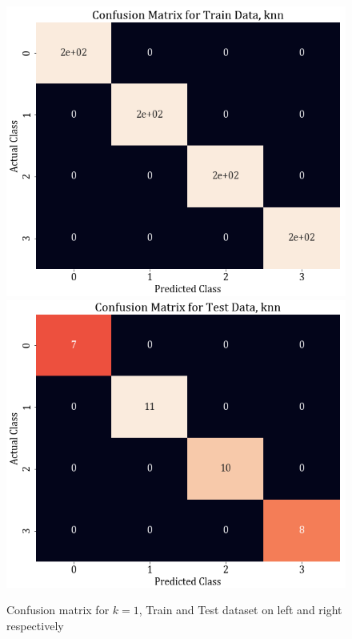 \documentclass[11pt,a4paper]{article}
\begin{document}
\begin{figure}[H]
    \includegraphics[scale=0.4]{images/1a_conf_mat_knn_train.png}
    \includegraphics[scale=0.4]{images/1a_conf_mat_knn_test.png}
    \caption{Confusion matrix for $k=1$, Train and Test dataset on left and right respectively}
    \label{fig:1A_cm_KNN}
\end{figure}
\end{document}
